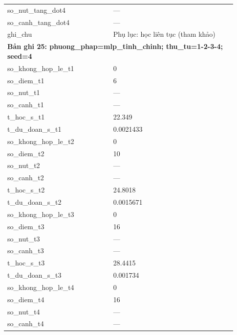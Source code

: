 \begin{longtable}{p{0.43\linewidth}p{0.50\linewidth}}
so\_\allowbreak nut\_\allowbreak tang\_\allowbreak dot4 & — \\
so\_\allowbreak canh\_\allowbreak tang\_\allowbreak dot4 & — \\
ghi\_\allowbreak chu & Phụ lục: học liên tục (tham khảo) \\
\midrule
\multicolumn{2}{p{0.95\linewidth}}{\textbf{Bản ghi 25: phuong\_phap=mlp\_tinh\_chinh; thu\_tu=1-2-3-4; seed=4}} \\
so\_\allowbreak khong\_\allowbreak hop\_\allowbreak le\_\allowbreak t1 & 0 \\
so\_\allowbreak diem\_\allowbreak t1 & 6 \\
so\_\allowbreak nut\_\allowbreak t1 & — \\
so\_\allowbreak canh\_\allowbreak t1 & — \\
t\_\allowbreak hoc\_\allowbreak s\_\allowbreak t1 & 22.349 \\
t\_\allowbreak du\_\allowbreak doan\_\allowbreak s\_\allowbreak t1 & 0.0021433 \\
so\_\allowbreak khong\_\allowbreak hop\_\allowbreak le\_\allowbreak t2 & 0 \\
so\_\allowbreak diem\_\allowbreak t2 & 10 \\
so\_\allowbreak nut\_\allowbreak t2 & — \\
so\_\allowbreak canh\_\allowbreak t2 & — \\
t\_\allowbreak hoc\_\allowbreak s\_\allowbreak t2 & 24.8018 \\
t\_\allowbreak du\_\allowbreak doan\_\allowbreak s\_\allowbreak t2 & 0.0015671 \\
so\_\allowbreak khong\_\allowbreak hop\_\allowbreak le\_\allowbreak t3 & 0 \\
so\_\allowbreak diem\_\allowbreak t3 & 16 \\
so\_\allowbreak nut\_\allowbreak t3 & — \\
so\_\allowbreak canh\_\allowbreak t3 & — \\
t\_\allowbreak hoc\_\allowbreak s\_\allowbreak t3 & 28.4415 \\
t\_\allowbreak du\_\allowbreak doan\_\allowbreak s\_\allowbreak t3 & 0.001734 \\
so\_\allowbreak khong\_\allowbreak hop\_\allowbreak le\_\allowbreak t4 & 0 \\
so\_\allowbreak diem\_\allowbreak t4 & 16 \\
so\_\allowbreak nut\_\allowbreak t4 & — \\
so\_\allowbreak canh\_\allowbreak t4 & — \\

\end{longtable}
